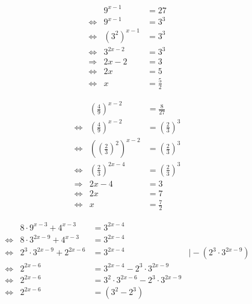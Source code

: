 \begin{uebung}[1]
    \begin{equation*}
        \begin{array}{lrl}
            & 9^{x-1} &= 27 \\
            \Leftrightarrow& 9^{x-1} &= 3^3 \\
            \Leftrightarrow& {(3^2)}^{x-1} &= 3^3 \\
            \Leftrightarrow& 3^{2x-2} &= 3^3 \\
            \Rightarrow& 2x-2 &= 3 \\
            \Leftrightarrow& 2x &= 5 \\
            \Leftrightarrow& x &= \frac{5}{2}
        \end{array}
    \end{equation*}
\end{uebung}

\begin{uebung}[2]
    \begin{equation*}
        \begin{array}{lrl}
            & {\left(\frac{4}{9}\right)}^{x-2} &= \frac{8}{27} \\
            \Leftrightarrow& {\left(\frac{4}{9}\right)}^{x-2} &=
            {\left(\frac{2}{3}\right)}^{3} \\
            \Leftrightarrow& {\left({\left(\frac{2}{3}\right)}^{2}\right)}^{x-2} &=
            {\left(\frac{2}{3}\right)}^{3} \\
            \Leftrightarrow& {\left(\frac{2}{3}\right)}^{2x-4} &=
            {\left(\frac{2}{3}\right)}^{3} \\
            \Rightarrow& 2x-4 &= 3 \\
            \Leftrightarrow& 2x &= 7 \\
            \Leftrightarrow& x &= \frac{7}{2}
        \end{array}
    \end{equation*}
\end{uebung}

\begin{uebung}[3]
    \begin{equation*}
        \begin{array}{lrlr}
            & 8 \cdot 9^{x-3} + 4^{x-3} &= 3^{2x-4} & \\
            \Leftrightarrow& 8 \cdot 3^{2x-9} + 4^{x-3} &= 3^{2x-4} & \\
            \Leftrightarrow& 2^3 \cdot 3^{2x-9} + 2^{2x-6} &= 3^{2x-4} &\mid -(2^3 \cdot 3^{2x-9}) \\
            \Leftrightarrow& 2^{2x-6} &= 3^{2x-4} - 2^3 \cdot 3^{2x-9} & \\
            \Leftrightarrow& 2^{2x-6} &= 3^{2} \cdot 3^{2x-6} - 2^{3} \cdot 3^{2x-9} \\
            \Leftrightarrow& 2^{2x-6} &= (3^2 - 2^3)
        \end{array}
    \end{equation*}
\end{uebung}
